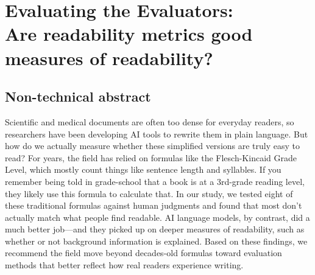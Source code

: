 \chapter{Evaluating the Evaluators:\\Are readability metrics good measures of readability?} \label{chap:chap-5}




\section*{Non-technical abstract}
    Scientific and medical documents are often too dense for everyday readers, so researchers have been developing AI tools to rewrite them in plain language. But how do we actually measure whether these simplified versions are truly easy to read? For years, the field has relied on formulas like the Flesch-Kincaid Grade Level, which mostly count things like sentence length and syllables. If you remember being told in grade-school that a book is at a 3rd-grade reading level, they likely use this formula to calculate that. In our study, we tested eight of these traditional formulas against human judgments and found that most don't actually match what people find readable. AI language models, by contrast, did a much better job—and they picked up on deeper measures of readability, such as whether or not background information is explained. Based on these findings, we recommend the field move beyond decades-old formulas toward evaluation methods that better reflect how real readers experience writing.







